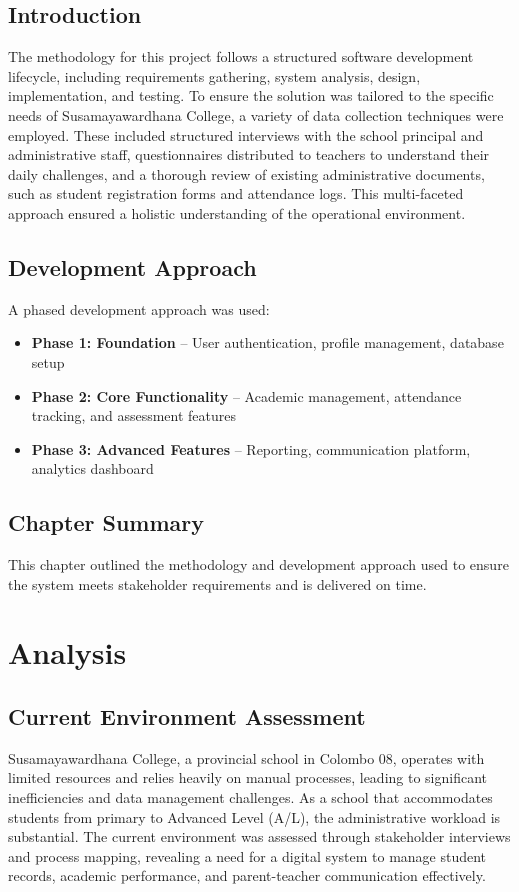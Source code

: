 \documentclass[12pt,a4paper]{report}
\begin{document}
\section{Introduction}
The methodology for this project follows a structured software development lifecycle, including requirements gathering, system analysis, design, implementation, and testing. To ensure the solution was tailored to the specific needs of Susamayawardhana College, a variety of data collection techniques were employed. These included structured interviews with the school principal and administrative staff, questionnaires distributed to teachers to understand their daily challenges, and a thorough review of existing administrative documents, such as student registration forms and attendance logs. This multi-faceted approach ensured a holistic understanding of the operational environment.

\section{Development Approach}
A phased development approach was used:
\begin{itemize}
    \item \textbf{Phase 1: Foundation} -- User authentication, profile management, database setup
    \item \textbf{Phase 2: Core Functionality} -- Academic management, attendance tracking, and assessment features
    \item \textbf{Phase 3: Advanced Features} -- Reporting, communication platform, analytics dashboard
\end{itemize}

\section{Chapter Summary}
This chapter outlined the methodology and development approach used to ensure the system meets stakeholder requirements and is delivered on time.

\chapter{Analysis}
\section{Current Environment Assessment}
Susamayawardhana College, a provincial school in Colombo 08, operates with limited resources and relies heavily on manual processes, leading to significant inefficiencies and data management challenges. As a school that accommodates students from primary to Advanced Level (A/L), the administrative workload is substantial. The current environment was assessed through stakeholder interviews and process mapping, revealing a need for a digital system to manage student records, academic performance, and parent-teacher communication effectively.
\end{document}
